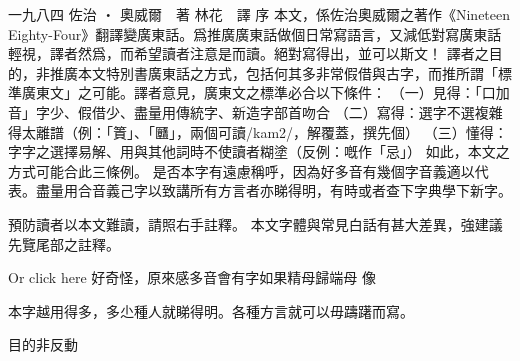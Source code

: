 一九八四
佐治 ‧ 奧威爾　著
林花　譯
序
本文，係佐治奧威爾之著作《Nineteen Eighty-Four》翻譯變廣東話。爲推廣廣東話做個日常寫語言，又減低對寫廣東話輕視，譯者然爲，而希望讀者注意是而讀。絕對寫得出，並可以斯文！
譯者之目的，非推廣本文特別書廣東話之方式，包括何其多非常假借與古字，而推所謂「標準廣東文」之可能。譯者意見，廣東文之標準必合以下條件：
（一）見得：「口加音」字少、假借少、盡量用傳統字、新造字部首吻合
（二）寫得：選字不選複雜得太離譜（例：「篢」、「㔶」，兩個可讀/kam2/，解覆蓋，撰先個）
（三）懂得：字字之選擇易解、用與其他詞時不使讀者糊塗（反例：嘅作「忌」）
如此，本文之方式可能合此三條例。
是否本字有遠慮稱呼，因為好多音有幾個字音義適以代表。盡量用合音義己字以致講所有方言者亦睇得明，有時或者查下字典學下新字。

預防讀者以本文難讀，請照右手註釋。
本文字體與常見白話有甚大差異，強建議先覽尾部之註釋。

Or click here
好奇怪，原來感多音會有字如果精母歸端母
像

本字越用得多，多尐種人就睇得明。各種方言就可以毋躊躇而寫。

目的非反動


